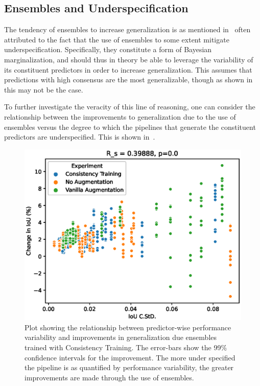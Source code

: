 \subsection{Ensembles and Underspecification} \label{ensemble_underspecification}
The tendency of ensembles to increase generalization is as mentioned in~ often attributed to the fact that the use of ensembles to some extent mitigate underspecification. Specifically, they constitute a form of Bayesian marginalization, and should thus in theory be able to leverage the variability of its constituent predictors in order to increase generalization. This assumes that predictions with high consensus are the most generalizable, though as shown in  this may not be the case. 

To further investigate the veracity of this line of reasoning, one can consider the relationship between the improvements to generalization due to the use of ensembles versus the degree to which the pipelines that generate the constituent predictors are underspecified. This is shown in~. 
\begin{figure}[!hbt]
    \centering
    \includegraphics[width=0.9\linewidth]{illustrations/ensembles_underspecification.eps}
    \caption[Relationship between ensemble improvements and underspecification]{Plot showing the relationship between predictor-wise performance variability and improvements in generalization due ensembles trained with Consistency Training. The error-bars show the 99\% confidence intervals for the improvement. The more under specified the pipeline is as quantified by performance variability, the greater improvements are made through the use of ensembles. }
    \label{fig:ensemble_var}
\end{figure}


